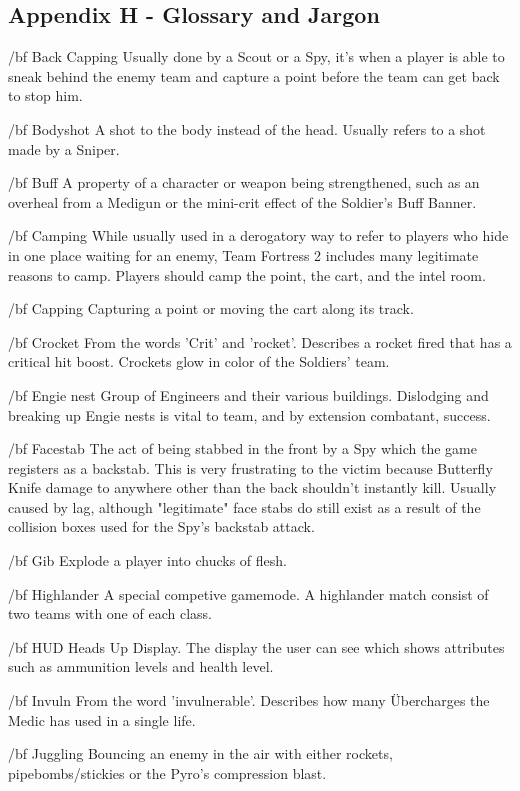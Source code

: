 \subsection{Appendix H - Glossary and Jargon}

{/bf Back Capping} Usually done by a Scout or a Spy, it’s when a player is able to sneak behind the enemy team and capture a point before the team can get back to stop him.

{/bf Bodyshot} A shot to the body instead of the head. Usually refers to a shot made by a Sniper. 

{/bf Buff} A property of a character or weapon being strengthened, such as an overheal from a Medigun or the mini-crit effect of the Soldier's Buff Banner.

{/bf Camping} While usually used in a derogatory way to refer to players who hide in one place waiting for an enemy, Team Fortress 2 includes many legitimate reasons to camp. Players should camp the point, the cart, and the intel room.

{/bf Capping} Capturing a point or moving the cart along its track.

{/bf Crocket} From the words 'Crit' and 'rocket'. Describes a rocket fired that has a critical hit boost. Crockets glow in color of the Soldiers' team.

{/bf Engie nest} Group of Engineers and their various buildings. Dislodging and breaking up Engie nests is vital to team, and by extension combatant, success. 

{/bf Facestab} The act of being stabbed in the front by a Spy which the game registers as a backstab. This is very frustrating to the victim because Butterfly Knife damage to anywhere other than the back shouldn't instantly kill. Usually caused by lag, although "legitimate" face stabs do still exist as a result of the collision boxes used for the Spy's backstab attack. 

{/bf Gib} Explode a player into chucks of flesh.

{/bf Highlander} A special competive gamemode. A highlander match consist of two teams with one of each class.

{/bf HUD} Heads Up Display. The display the user can see which shows attributes such as ammunition levels and health level.

{/bf Invuln} From the word 'invulnerable'. Describes how many Übercharges the Medic has used in a single life.  

{/bf Juggling} Bouncing an enemy in the air with either rockets, pipebombs/stickies or the Pyro's compression blast.

